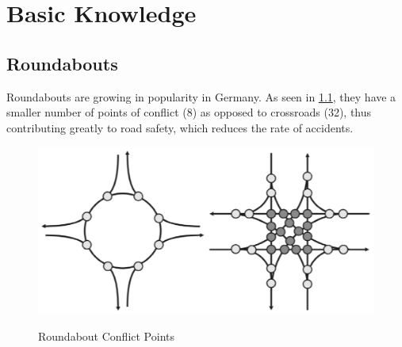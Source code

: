 \chapter{Basic Knowledge}

\section{Roundabouts}
Roundabouts are growing in popularity in Germany.  As seen in \cref{conflict_roundabout}, they have a smaller number of points of conflict (8)
as opposed to crossroads (32), thus contributing greatly to road safety, which reduces the rate of accidents.

\begin{figure}[!ht]
\caption{Roundabout Conflict Points \cite{man06}}
 \includegraphics[width=\textwidth]{bilder/conflict.png}
\label{conflict_roundabout}
\end{figure}





